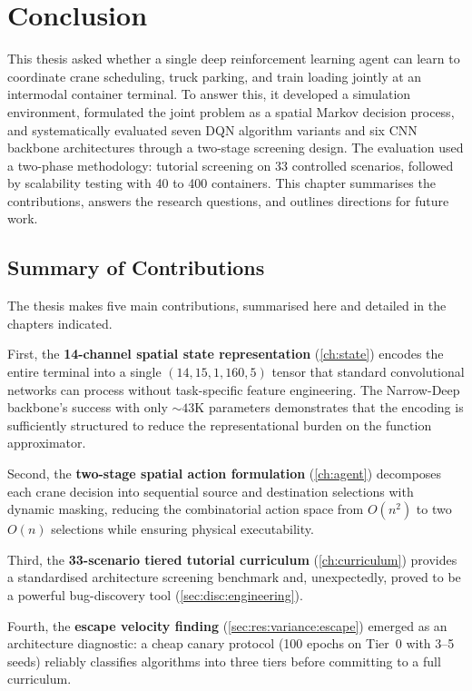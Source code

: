\chapter{Conclusion}
\label{ch:conclusion}

This thesis asked whether a single deep reinforcement learning agent can learn to coordinate crane scheduling, truck parking, and train loading jointly at an intermodal container terminal. To answer this, it developed a simulation environment, formulated the joint problem as a spatial Markov decision process, and systematically evaluated seven DQN algorithm variants and six CNN backbone architectures through a two-stage screening design. The evaluation used a two-phase methodology: tutorial screening on 33 controlled scenarios, followed by scalability testing with 40 to 400 containers. This chapter summarises the contributions, answers the research questions, and outlines directions for future work.

\section{Summary of Contributions}
\label{sec:concl:summary}

The thesis makes five main contributions, summarised here and detailed in the chapters indicated.

First, the \textbf{14-channel spatial state representation} (\cref{ch:state}) encodes the entire terminal into a single $(14, 15, 1{,}160, 5)$ tensor that standard convolutional networks can process without task-specific feature engineering. The Narrow-Deep backbone's success with only ${\sim}43$K parameters demonstrates that the encoding is sufficiently structured to reduce the representational burden on the function approximator.

Second, the \textbf{two-stage spatial action formulation} (\cref{ch:agent}) decomposes each crane decision into sequential source and destination selections with dynamic masking, reducing the combinatorial action space from $O(n^2)$ to two $O(n)$ selections while ensuring physical executability.

Third, the \textbf{33-scenario tiered tutorial curriculum} (\cref{ch:curriculum}) provides a standardised architecture screening benchmark and, unexpectedly, proved to be a powerful bug-discovery tool (\cref{sec:disc:engineering}).

Fourth, the \textbf{escape velocity finding} (\cref{sec:res:variance:escape}) emerged as an architecture diagnostic: a cheap canary protocol (100 epochs on Tier~0 with 3--5 seeds) reliably classifies algorithms into three tiers before committing to a full curriculum.

